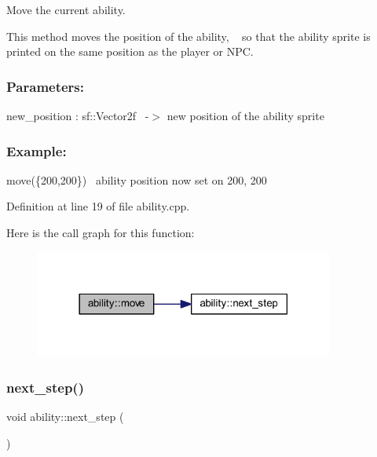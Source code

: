 Move the current ability. 

This method moves the position of the ability, ~\newline
so that the ability sprite is printed on the same position as the player or N\+PC.~\newline


\subsubsection*{Parameters\+: }

new\+\_\+position \+: sf\+::\+Vector2f~\newline
-\/$>$ new position of the ability sprite

\subsubsection*{Example\+: }

move(\{200,200\})~\newline
ability position now set on 200, 200~\newline


Definition at line 19 of file ability.\+cpp.

Here is the call graph for this function\+:
\nopagebreak
\begin{figure}[H]
\begin{center}
\leavevmode
\includegraphics[width=278pt]{classability_ae34dc7ddb4b0fdb1b00e70ce1860456e_cgraph}
\end{center}
\end{figure}
\mbox{\label{classability_aed378a7d8a69e8a50347bcc03c0cffb3}} 
\subsubsection{\texorpdfstring{next\+\_\+step()}{next\_step()}}
{\footnotesize\ttfamily void ability\+::next\+\_\+step (\begin{DoxyParamCaption}{ }\end{DoxyParamCaption})}



